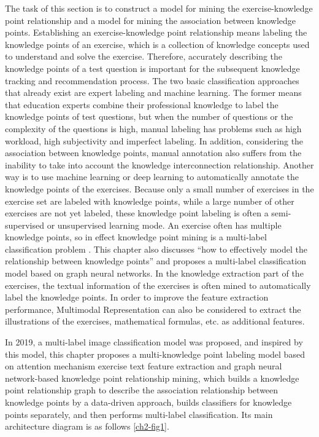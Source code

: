 The task of this section is to construct a model for mining the exercise-knowledge point relationship and a model for mining the association between knowledge points. Establishing an exercise-knowledge point relationship means labeling the knowledge points of an exercise, which is a collection of knowledge concepts used to understand and solve the exercise. Therefore, accurately describing the knowledge points of a test question is important for the subsequent knowledge tracking and recommendation process. The two basic classification approaches that already exist are expert labeling and machine learning. The former means that education experts combine their professional knowledge to label the knowledge points of test questions, but when the number of questions or the complexity of the questions is high, manual labeling has problems such as high workload, high subjectivity and imperfect labeling. In addition, considering the association between knowledge points, manual annotation also suffers from the inability to take into account the knowledge interconnection relationship. Another way is to use machine learning or deep learning to automatically annotate the knowledge points of the exercises. Because only a small number of exercises in the exercise set are labeled with knowledge points, while a large number of other exercises are not yet labeled, these knowledge point labeling is often a semi-supervised or unsupervised learning mode. An exercise often has multiple knowledge points, so in effect knowledge point mining is a multi-label classification problem \cite{tsoumakas2007multi,zhang2013review,liu2020emerging}. This chapter also discusses ``how to effectively model the relationship between knowledge points'' and proposes a multi-label classification model based on graph neural networks. In the knowledge extraction part of the exercises, the textual information of the exercises is often mined to automatically label the knowledge points. In order to improve the feature extraction performance, Multimodal Representation \cite{guo2019deep} can also be considered to extract the illustrations of the exercises, mathematical formulas, etc. as additional features.

In 2019, a multi-label image classification model was proposed\cite{chen2019multi}, and inspired by this model, this chapter proposes a multi-knowledge point labeling model based on attention mechanism exercise text feature extraction and graph neural network-based knowledge point relationship mining, which builds a knowledge point relationship graph to describe the association relationship between knowledge points by a data-driven approach, builds classifiers for knowledge points separately, and then performs multi-label classification. Its main architecture diagram is as follows \figurename{\ref{ch2-fig1}}.

